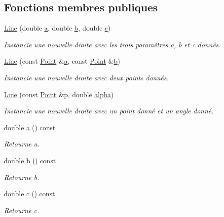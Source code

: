 \subsection*{Fonctions membres publiques}
\begin{DoxyCompactItemize}
\item 
\hyperlink{classLine_aba5e77c92e5e6932e90d0c083e6509e5}{Line} (double \hyperlink{classLine_a47fbf6abd88d639659beb7a5c7a22a86}{a}, double \hyperlink{classLine_a3fbf3dbd1b40db13b2624d69ab5cca27}{b}, double \hyperlink{classLine_a178f0e9f733556ef03ba94e5aac96005}{c})
\begin{DoxyCompactList}\small\item\em Instancie une nouvelle droite avec les trois paramètres a, b et c donnés. \end{DoxyCompactList}\item 
\hyperlink{classLine_a0ec34f80a43014768ec228bfa87fd15f}{Line} (const \hyperlink{classPoint}{Point} \&\hyperlink{classLine_a47fbf6abd88d639659beb7a5c7a22a86}{a}, const \hyperlink{classPoint}{Point} \&\hyperlink{classLine_a3fbf3dbd1b40db13b2624d69ab5cca27}{b})
\begin{DoxyCompactList}\small\item\em Instancie une nouvelle droite avec deux points donnés. \end{DoxyCompactList}\item 
\hyperlink{classLine_a30f99e975efe2a498c2d8ad7c9d1cdf2}{Line} (const \hyperlink{classPoint}{Point} \&p, double \hyperlink{classLine_afe0a0abb45c0adccaedfaded8645600f}{alpha})
\begin{DoxyCompactList}\small\item\em Instancie une nouvelle droite avec un point donné et un angle donné. \end{DoxyCompactList}\item 
double \hyperlink{classLine_a47fbf6abd88d639659beb7a5c7a22a86}{a} () const 
\begin{DoxyCompactList}\small\item\em Retourne a. \end{DoxyCompactList}\item 
double \hyperlink{classLine_a3fbf3dbd1b40db13b2624d69ab5cca27}{b} () const 
\begin{DoxyCompactList}\small\item\em Retourne b. \end{DoxyCompactList}\item 
double \hyperlink{classLine_a178f0e9f733556ef03ba94e5aac96005}{c} () const 
\begin{DoxyCompactList}\small\item\em Retourne c. \end{DoxyCompactList}\item 

\end{DoxyCompactItemize}
